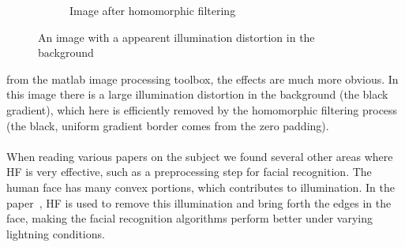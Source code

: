 \begin{figure}[h!]
\begin{subfigure}[b]{0.5\linewidth}
          \caption{Image after homomorphic filtering}
          \label{fig:microbe_after}
        \end{subfigure}
        \caption{An image with a appearent illumination distortion in the background}	
        \label{fig:gamma_diff}
		\end{figure}
		from the matlab image processing toolbox, the effects are much more obvious. 
		In this image there is a large illumination
		distortion in the background (the black gradient), which here is efficiently 
		removed by the homomorphic filtering process (the black, uniform gradient border
		comes from the zero padding). \\
		\\
		When reading various papers on the
		subject we found several other areas where HF is very effective,
		such as a preprocessing step for facial recognition. The human face has many convex
		portions, which contributes to illumination. In the paper~\cite{Fan20111468}, HF
		is used to remove this illumination and bring forth the edges in the face, making
		the facial recognition algorithms perform better under varying lightning conditions.